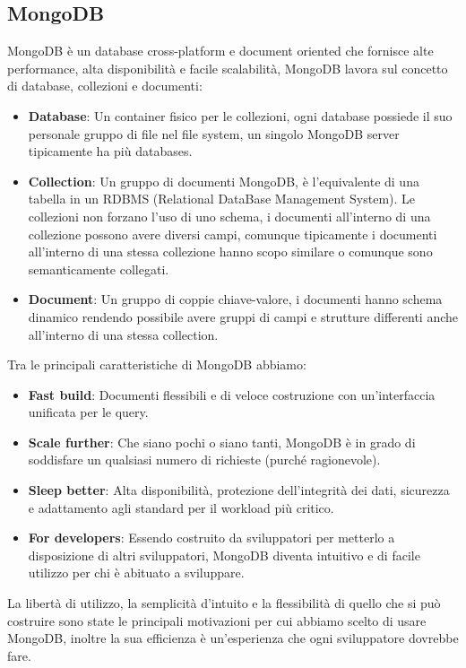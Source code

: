 \documentclass{article}
\begin{document}
\subsection{MongoDB}\label{sub:mongo}
MongoDB è un database cross-platform e document oriented che fornisce alte performance, alta disponibilità e facile scalabilità, MongoDB lavora sul concetto di database, collezioni e documenti:
\begin{itemize}
	\item \textbf{Database}: Un container fisico per le collezioni, ogni database possiede il suo personale gruppo di file nel file system, un singolo MongoDB server tipicamente ha più databases.
	\item \textbf{Collection}: Un gruppo di documenti MongoDB, è l'equivalente di una tabella in un RDBMS (Relational DataBase Management System). Le collezioni non forzano l'uso di uno schema, i documenti all'interno di una collezione possono avere diversi campi, comunque tipicamente i documenti all'interno di una stessa collezione hanno scopo similare o comunque sono semanticamente collegati.
	\item \textbf{Document}: Un gruppo di coppie chiave-valore, i documenti hanno schema dinamico rendendo possibile avere gruppi di campi e strutture differenti anche all'interno di una stessa collection.
\end{itemize}
Tra le principali caratteristiche di MongoDB abbiamo:
\begin{itemize}
	\item \textbf{Fast build}: Documenti flessibili e di veloce costruzione con un'interfaccia unificata per le query.
	\item \textbf{Scale further}: Che siano pochi o siano tanti, MongoDB è in grado di soddisfare un qualsiasi numero di richieste (purché ragionevole).
	\item \textbf{Sleep better}: Alta disponibilità, protezione dell'integrità dei dati, sicurezza e adattamento agli standard per il workload più critico.
	\item \textbf{For developers}: Essendo costruito da sviluppatori per metterlo a disposizione di altri sviluppatori, MongoDB diventa intuitivo e di facile utilizzo per chi è abituato a sviluppare.
\end{itemize}
La libertà di utilizzo, la semplicità d'intuito e la flessibilità di quello che si può costruire sono state le principali motivazioni per cui abbiamo scelto di usare MongoDB, inoltre la sua efficienza è un'esperienza che ogni sviluppatore dovrebbe fare.
\end{document}
